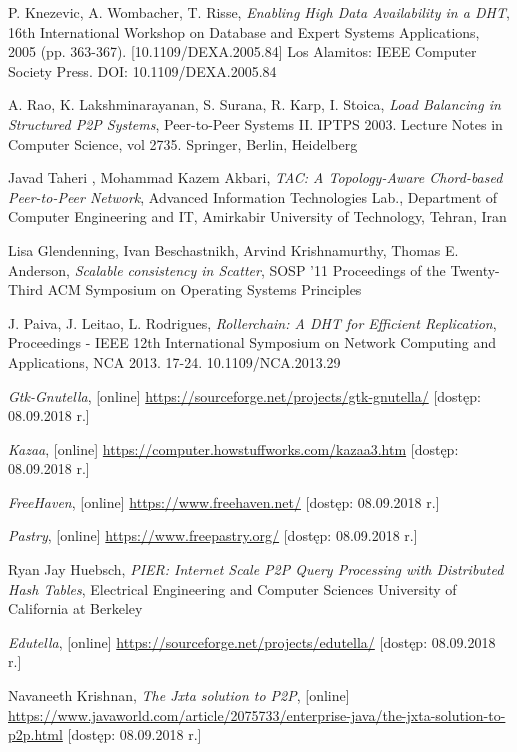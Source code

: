 \documentclass[12pt, twoside, openany]{report}
\begin{document}
\begin{thebibliography}{11}
 P. Knezevic, A. Wombacher, T. Risse, \emph{Enabling High Data Availability in a DHT}, 16th International Workshop on Database and Expert Systems Applications, 2005 (pp. 363-367). [10.1109/DEXA.2005.84] Los Alamitos: IEEE Computer Society Press. DOI: 10.1109/DEXA.2005.84

 A. Rao, K. Lakshminarayanan, S. Surana, R. Karp, I. Stoica, \emph{Load Balancing in Structured P2P Systems}, Peer-to-Peer Systems II. IPTPS 2003. Lecture Notes in Computer Science, vol 2735. Springer, Berlin, Heidelberg

 Javad Taheri , Mohammad Kazem Akbari, \emph{TAC: A Topology-Aware Chord-based Peer-to-Peer Network}, Advanced Information Technologies Lab., Department of Computer Engineering and IT, Amirkabir University of Technology, Tehran, Iran

 Lisa Glendenning, Ivan Beschastnikh, Arvind Krishnamurthy, Thomas E. Anderson, \emph{Scalable consistency in Scatter}, SOSP '11 Proceedings of the Twenty-Third ACM Symposium on Operating Systems Principles

 J. Paiva, J. Leitao, L. Rodrigues, \emph{Rollerchain: A DHT for Efficient Replication}, Proceedings - IEEE 12th International Symposium on Network Computing and Applications, NCA 2013. 17-24. 10.1109/NCA.2013.29

 \emph{Gtk-Gnutella}, [online] \url{https://sourceforge.net/projects/gtk-gnutella/} [dostęp: 08.09.2018 r.]

 \emph{Kazaa}, [online] \url{https://computer.howstuffworks.com/kazaa3.htm} [dostęp: 08.09.2018 r.]

 \emph{FreeHaven}, [online] \url{https://www.freehaven.net/} [dostęp: 08.09.2018 r.]

 \emph{Pastry}, [online] \url{https://www.freepastry.org/} [dostęp: 08.09.2018 r.]

 Ryan Jay Huebsch, \emph{PIER: Internet Scale P2P Query Processing with Distributed Hash Tables}, Electrical Engineering and Computer Sciences University of California at Berkeley

 \emph{Edutella}, [online] \url{https://sourceforge.net/projects/edutella/} [dostęp: 08.09.2018 r.]

 Navaneeth Krishnan, \emph{The Jxta solution to P2P}, [online] \url{https://www.javaworld.com/article/2075733/enterprise-java/the-jxta-solution-to-p2p.html} [dostęp: 08.09.2018 r.]


\end{thebibliography}
\end{document}
